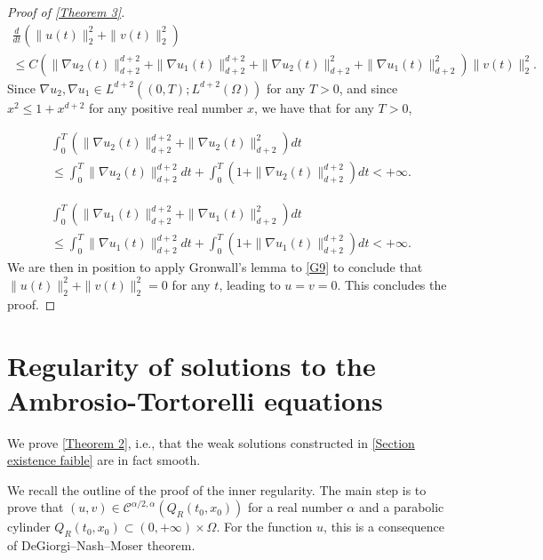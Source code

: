 \documentclass[reqno,12pt,twoside]{amsart}
\numberwithin{equation}{section} \numberwithin{theorem}{section}
\numberwithin{proposition}{section} \numberwithin{lemma}{section}
\numberwithin{corollary}{section}
\numberwithin{definition}{section} \numberwithin{remark}{section}
\begin{document}
\begin{proof}[Proof of \autoref{Theorem 3}]
\begin{multline}\label{G9}
\frac{d}{dt}\left(\|u(t)\|_2^2 +\|v(t)\|_2^2\right)\\
\leqslant C \left(\|\nabla u_2(t)\|_{d+2}^{d+2} +\|\nabla u_1(t)\|_{d+2}^{d+2} + \|\nabla u_2(t)\|_{d+2}^2 +\|\nabla u_1(t)\|_{d+2}^2\right)\|v(t)\|_2^2. 
\end{multline}
Since $\nabla u_2, \nabla u_1 \in L^{d+2}((0,T); L^{d+2}(\Omega))$ for any $T >0$, and since $x^2 \leqslant 1 + x^{d+2}$ for any positive real number $x$, we have that for any $T >0$, 

\begin{multline*}
\int_0^T \left(\|\nabla u_2(t)\|_{d+2}^{d+2} + \|\nabla u_2(t)\|_{d+2}^2\right)dt\\
 \leqslant \int_0^T \|\nabla u_2(t)\|_{d+2}^{d+2}dt + \int_0^T \left( 1+ \|\nabla u_2(t)\|_{d+2}^{d+2} \right)dt <+\infty.
\end{multline*}

\begin{multline*}
\int_0^T \left(\|\nabla u_1(t)\|_{d+2}^{d+2} + \|\nabla u_1(t)\|_{d+2}^2\right)dt\\
 \leqslant \int_0^T \|\nabla u_1(t)\|_{d+2}^{d+2}dt + \int_0^T \left( 1+ \|\nabla u_1(t)\|_{d+2}^{d+2} \right)dt <+\infty.
\end{multline*}
We are then in position to apply Gronwall's lemma to \eqref{G9} to conclude that $\|u(t)\|_2^2 +\|v(t)\|_2^2 =0$ for any $t$, leading to $u=v=0$. This concludes the proof. 
\end{proof}

\section{Regularity of solutions to the Ambrosio-Tortorelli equations}
\label{section régularité}

We prove \autoref{Theorem 2}, i.e., that the weak solutions constructed in \autoref{Section existence faible} are in fact smooth. 

We recall the outline of the proof of the inner regularity. The main step is to prove that $(u,v)\in \mathcal{C}^{\alpha/2, \alpha}(Q_R(t_0,x_0))$ for a real number $\alpha$ and a parabolic cylinder $Q_R(t_0,x_0) \subset (0,+\infty)\times \Omega$. For the function $u$, this is a consequence of DeGiorgi--Nash--Moser theorem.
\end{document}
